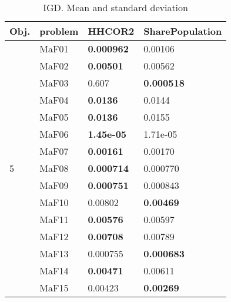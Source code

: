 \documentclass[]{article}
\begin{document}
\begin{table}
\caption{IGD. Mean and standard deviation}
\label{table:mean.IGD}
\centering
\begin{footnotesize}
\begin{tabular}{|l|l|l|l|}
\hline
Obj. & problem  & HHCOR2 & SharePopulation \\ \hline

\multirow{15}{*}{5} & MaF01 & \cellcolor{gray95} {\bf 0.000962} & 0.00106\\
 & MaF02 & \cellcolor{gray95} {\bf 0.00501} & 0.00562\\
 & MaF03 & 0.607 & \cellcolor{gray95} {\bf 0.000518}\\
 & MaF04 & \cellcolor{gray95} {\bf 0.0136} & 0.0144\\
 & MaF05 & \cellcolor{gray95} {\bf 0.0136} & 0.0155\\
 & MaF06 & \cellcolor{gray95} {\bf 1.45e-05} & 1.71e-05\\
 & MaF07 & \cellcolor{gray95} {\bf 0.00161} & 0.00170\\
 & MaF08 & \cellcolor{gray95} {\bf 0.000714} & 0.000770\\
 & MaF09 & \cellcolor{gray95} {\bf 0.000751} & 0.000843\\
 & MaF10 & 0.00802 & \cellcolor{gray95} {\bf 0.00469}\\
 & MaF11 & \cellcolor{gray95} {\bf 0.00576} & \cellcolor{gray95} 0.00597\\
 & MaF12 & \cellcolor{gray95} {\bf 0.00708} & 0.00789\\
 & MaF13 & 0.000755 & \cellcolor{gray95} {\bf 0.000683}\\
 & MaF14 & \cellcolor{gray95} {\bf 0.00471} & 0.00611\\
 & MaF15 & 0.00423 & \cellcolor{gray95} {\bf 0.00269}\\
\hline


\end{tabular}
\end{footnotesize}
\end{table}
\end{document}
